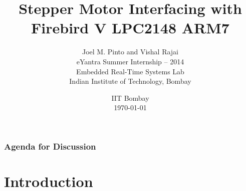 \documentclass[table,10pt,red]{beamer}	%
\title
[
	Firebird LPC2148 ARM7 Robotics Research Platform	%
	\hspace{0.5cm}
	\insertframenumber/\inserttotalframenumber
]
{
	Stepper Motor Interfacing with Firebird V LPC2148 ARM7
}
\author
[
	www.e-yantra.org 	%
]
{
  Joel M. Pinto and Vishal Rajai\\
  eYantra Summer Internship -- 2014\\
  Embedded Real-Time Systems Lab\\
  Indian Institute of Technology, Bombay\\
}
\date
{
IIT Bombay \\ {\today}	%
}
\begin{document}
\begin{frame}
	\titlepage
\end{frame}

\begin{frame}
	\frametitle{Agenda for Discussion}
	
	\tableofcontents
\end{frame}

\section{Introduction}
\end{document}
